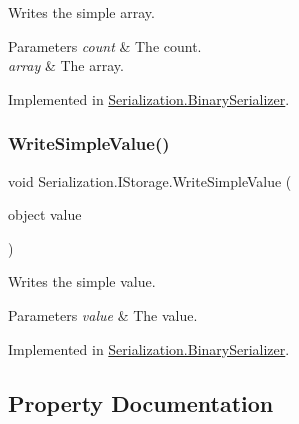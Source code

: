 Writes the simple array. 


\begin{DoxyParams}{Parameters}
{\em count} & The count.\\
\hline
{\em array} & The array.\\
\hline
\end{DoxyParams}


Implemented in \hyperlink{class_serialization_1_1_binary_serializer_ad694b37d2693fb305f569bebe076b9f8}{Serialization.\+Binary\+Serializer}.

\mbox{\label{interface_serialization_1_1_i_storage_ad71e5330badb887d80a59b576dbd9e1e}} 
\subsubsection{\texorpdfstring{Write\+Simple\+Value()}{WriteSimpleValue()}}
{\footnotesize\ttfamily void Serialization.\+I\+Storage.\+Write\+Simple\+Value (\begin{DoxyParamCaption}\item[{object}]{value }\end{DoxyParamCaption})}



Writes the simple value. 


\begin{DoxyParams}{Parameters}
{\em value} & The value.\\
\hline
\end{DoxyParams}


Implemented in \hyperlink{class_serialization_1_1_binary_serializer_a91a35ade763c6b2def327e82a5ea7dad}{Serialization.\+Binary\+Serializer}.



\subsection{Property Documentation}
\mbox{\label{interface_serialization_1_1_i_storage_a6096e94c37b632da7f415a4697f80f32}} 
